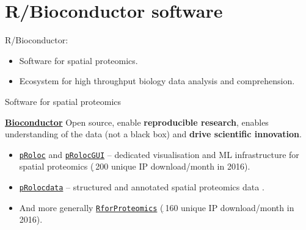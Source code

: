 \section{R/Bioconductor software}

\begin{frame}{}

  R/Bioconductor:
  \begin{itemize}
  \item Software for spatial proteomics.
  \item Ecosystem for high throughput biology data analysis and
    comprehension.
  \end{itemize}
  
\end{frame}

\begin{frame}{Software for spatial proteomics}
  \begin{block}{}
    \href{http://bioconductor.org/}{\textbf{Bioconductor}} Open
    source, enable \textbf{reproducible research}, enables
    understanding of the data (not a black box) and \textbf{drive
      scientific innovation}.

    \begin{small}
      \begin{itemize}
      \item
        \href{http://bioconductor.org/packages/release/bioc/html/pRoloc.html}{\texttt{pRoloc}}
        and
        \href{http://bioconductor.org/packages/release/bioc/html/pRolocGUI.html}{\texttt{pRolocGUI}}
        -- dedicated visualisation and ML infrastructure for spatial
        proteomics \citep{Gatto:2014} ($_{\widetilde{~}}$200 unique IP
        download/month in 2016).
      \item
        \href{http://bioconductor.org/packages/release/data/experiment/html/pRolocdata.html}{\texttt{pRolocdata}}
        -- structured and annotated spatial proteomics data
        \citep{Gatto:2014}.
      \item And more generally
        \href{http://www.bioconductor.org/packages/release/data/experiment/html/RforProteomics.html}{\texttt{RforProteomics}}
        \citep{Gatto:2014b} ($_{\widetilde{~}}$160 unique IP
        download/month in 2016).
      \end{itemize}
    \end{small}
  \end{block}   
\end{frame}




